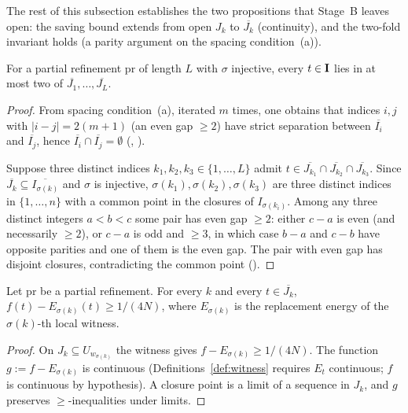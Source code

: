 The rest of this subsection establishes the two propositions
that Stage~B leaves open: the saving bound extends from open
$J_k$ to $\overline{J_k}$ (continuity), and the two-fold
invariant holds (a parity argument on the spacing condition~(a)).

\begin{proposition}
\label{prop:twofold}
For a partial refinement $\mathrm{pr}$ of length $L$ with
$\sigma$ injective, every $t \in \mathbf{I}$ lies in at most two of
$\overline{J_1}, \ldots, \overline{J_L}$.
\end{proposition}

\begin{proof}
From spacing condition~(a), iterated $m$ times, one obtains
that indices $i, j$ with $|i - j| = 2(m+1)$ (an even gap $\ge
2$) have strict separation between $\overline{I_i}$ and
$\overline{I_j}$, hence
$\overline{I_i} \cap \overline{I_j} = \emptyset$
(,
).

Suppose three distinct indices $k_1, k_2, k_3 \in \{1,\ldots,L\}$
admit $t \in \overline{J_{k_1}} \cap \overline{J_{k_2}} \cap
\overline{J_{k_3}}$. Since $\overline{J_k} \subseteq
\overline{I_{\sigma(k)}}$ and $\sigma$ is injective,
$\sigma(k_1), \sigma(k_2), \sigma(k_3)$ are three distinct
indices in $\{1,\ldots,n\}$ with a common point in the
closures of $I_{\sigma(k_i)}$. Among any three distinct
integers $a < b < c$ some pair has even gap $\ge 2$: either
$c - a$ is even (and necessarily $\ge 2$), or $c - a$ is odd
and $\ge 3$, in which case $b - a$ and $c - b$ have opposite
parities and one of them is the even gap. The pair with even
gap has disjoint closures, contradicting the common point
().
\end{proof}

\begin{proposition}
\label{prop:saving-bound}
Let $\mathrm{pr}$ be a partial refinement. For every $k$ and
every $t \in \overline{J_k}$,
$f(t) - E_{\sigma(k)}(t) \ge 1/(4N)$, where
$E_{\sigma(k)}$ is the replacement energy of the $\sigma(k)$-th
local witness.
\end{proposition}

\begin{proof}
On $J_k \subseteq U_{w_{\sigma(k)}}$ the witness gives
$f - E_{\sigma(k)} \ge 1/(4N)$. The function
$g := f - E_{\sigma(k)}$ is continuous
(Definitions~\ref{def:witness} requires $E_t$ continuous;
$f$ is continuous by hypothesis). A closure point is a limit of
a sequence in $J_k$, and $g$ preserves $\ge$-inequalities under
limits.
\end{proof}


